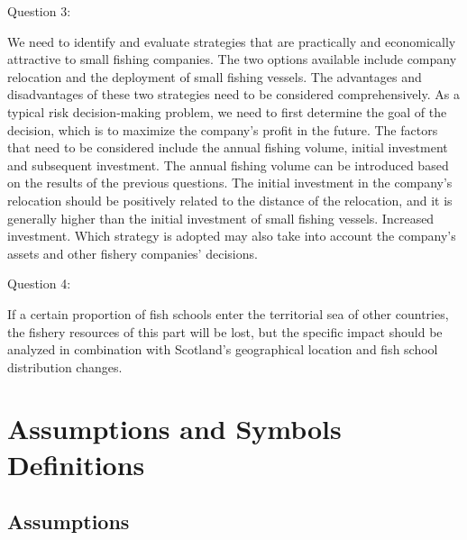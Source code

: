 \documentclass{mcmthesis}
\numberwithin{figure}{section}
\numberwithin{table}{section}
\begin{document}
Question 3: 

We need to identify and evaluate strategies that are practically and economically attractive to small fishing companies. The two options available include company relocation and the deployment of small fishing vessels. The advantages and disadvantages of these two strategies need to be considered comprehensively. As a typical risk decision-making problem, we need to first determine the goal of the decision, which is to maximize the company's profit in the future. The factors that need to be considered include the annual fishing volume, initial investment and subsequent investment. The annual fishing volume can be introduced based on the results of the previous questions. The initial investment in the company's relocation should be positively related to the distance of the relocation, and it is generally higher than the initial investment of small fishing vessels. Increased investment. Which strategy is adopted may also take into account the company's assets and other fishery companies' decisions.

Question 4:

If a certain proportion of fish schools enter the territorial sea of other countries, the fishery resources of this part will be lost, but the specific impact should be analyzed in combination with Scotland's geographical location and fish school distribution changes.
\section{Assumptions and Symbols Definitions}
\subsection{Assumptions}
\end{document}
